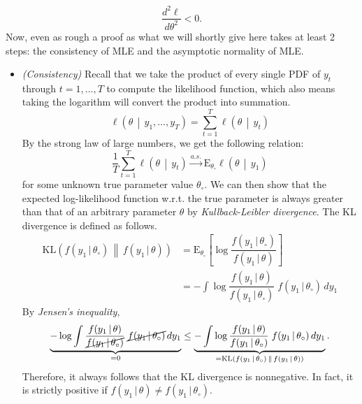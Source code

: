 \documentclass[answers]{exam}
\begin{document}
\begin{questions}
\begin{solution}
\begin{enumerate}[a)]
\begin{equation}
        \dfrac{d^{2}\ell}{d\theta^{2}} < 0.
      \end{equation}
      Now, even as rough a proof as what we will shortly give here takes at least 2 steps: the consistency of MLE and the asymptotic normality of MLE.
      \begin{itemize}
        \item \emph{(Consistency)} Recall that we take the product of every single PDF of $y_{t}$ through $t=1,\ldots,T$ to compute the likelihood function, which also means taking the logarithm will convert the product into summation.
        \begin{equation}
          \ell\left(\theta\,\middle|\,y_{1},\ldots,y_{T}\right) = \sum_{t=1}^{T}\ell\left(\theta\,\middle|\,y_{t}\right)
        \end{equation}
        By the strong law of large numbers, we get the following relation:
        \begin{equation}\label{eq:1}
          \dfrac{1}{T}\sum_{t=1}^{T}\ell\left(\theta\,\middle|\,y_{t}\right)\xrightarrow{a.s.}\mathrm{E}_{\theta_{\circ}}\ell\left(\theta\,\middle|\,y_{1}\right)
        \end{equation}
        for some unknown true parameter value $\theta_{\circ}$. We can then show that the expected log-likelihood function w.r.t. the true parameter is always greater than that of an arbitrary parameter $\theta$ by \emph{Kullback-Leibler divergence}. The KL divergence is defined as follows.
        \begin{align}
          \mathrm{KL}\left(f(y_{1}\,|\,\theta_{\circ})\,\middle\|\,f(y_{1}\,|\,\theta)\right) &= \mathrm{E}_{\theta_{\circ}}\left[\log \dfrac{f(y_{1}\,|\,\theta_{\circ})}{f(y_{1}\,|\,\theta)} \right]\\
          &= -\int \log \dfrac{f(y_{1}\,|\,\theta)}{f(y_{1}\,|\,\theta_{\circ})}\; f(y_{1}\,|\,\theta_{\circ})\,dy_{1}
        \end{align}
        By \emph{Jensen's inequality},
        \begin{equation}
          \underbrace{-\log\int \dfrac{f(y_{1}\,|\,\theta)}{\cancel{f(y_{1}\,|\,\theta_{\circ})}}\; \cancel{f(y_{1}\,|\,\theta_{\circ})}\,dy_{1}}_{=0} \leq \underbrace{-\int \log \dfrac{f(y_{1}\,|\,\theta)}{f(y_{1}\,|\,\theta_{\circ})}\; f(y_{1}\,|\,\theta_{\circ})\,dy_{1}}_{=\mathrm{KL}\left(f(y_{1}\,|\,\theta_{\circ})\,\middle\|\,f(y_{1}\,|\,\theta)\right) }.
        \end{equation}
        Therefore, it always follows that the KL divergence is nonnegative. In fact, it is strictly positive if $f(y_{1}\,|\,\theta)\neq f(y_{1}\,|\,\theta_{\circ})$.

\end{itemize}
\end{enumerate}
\end{solution}
\end{questions}
\end{document}
